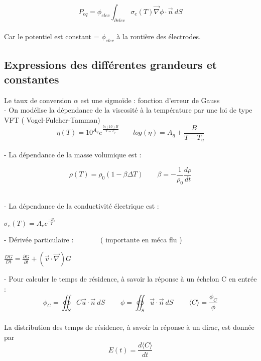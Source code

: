 \documentclass[12pt, a4paper, french, BCOR = 0pt, DIV = 10]{scrartcl}
\begin{document}
    \[ P_{eq}=\phi_{elec} \int_{\partial elec} \sigma_{e}(T)\vec \nabla\phi \cdot \vec{n}~dS\]
    \\
    Car le potentiel est constant = $\phi_{elec} $ à la rontière des électrodes. \\
    \subsection{ Expressions des différentes grandeurs et constantes}
    Le taux de conversion $\alpha$ est une sigmoïde : fonction d'erreur de Gauss\\ [0.3cm]
    
    - On modélise la dépendance de la viscosité à la température par une loi de type VFT ( Vogel-Fulcher-Tamman) \\ [0.5 cm]
    $$
    \eta (T)  = 10^{A_{\eta}} e^{\frac{ln(10) B}{T-T_{\eta}}} ~~~~~~~~~ log(\eta) = A_{\eta} + \frac{B}{T-T_{\eta}}
    $$

    - La dépendance de la masse volumique est : \\ [0.5 cm]
    \begin{center}
        
        
        $$
        \rho(T) = \rho_{0}  (1 - \beta \Delta T) ~~~~~~~~~ 
        \beta = -\frac{1}{\rho_{0}} \frac{d\rho}{dt}
        $$
        \\
    \end{center}
    
    
    
    - La dépendance de la conductivité électrique est : \\ [0.5 cm]
    \begin{center}
        $ 
        \sigma_{e} (T) =  A_{e} e^{\frac{-B_{e}}{T}}
        $
    \end{center}
    
    - Dérivée particulaire : ~~~~~~~( importante en méca flu )\\
    
    \begin{center}
        $ \frac{DG}{Dt}=\frac{\partial G}{\partial t} + (\vec {v} \cdot \vec {\nabla } ) G
        $ \\    
    \end{center}
    
    
    
    - Pour calculer le temps  de résidence, à savoir la réponse à un échelon C en entrée :\\ [0.5cm]
    $$
    \phi_{C} =  \oiint_S C\vec{u} \cdot \vec{n}~dS  ~~~~~~~~~~ \phi = \oiint_S \vec{u} \cdot \vec{n}~dS  ~~~~~~~~~~
    \langle C \rangle = \frac{\phi_{C}}{\phi}
    $$ 
    \\ [0.5 cm]
    La distribution des temps de résidence, à savoir la réponse à un dirac, est donnée par \[E(t)=\frac{d\langle C \rangle}{dt}\]
    
\end{document}

